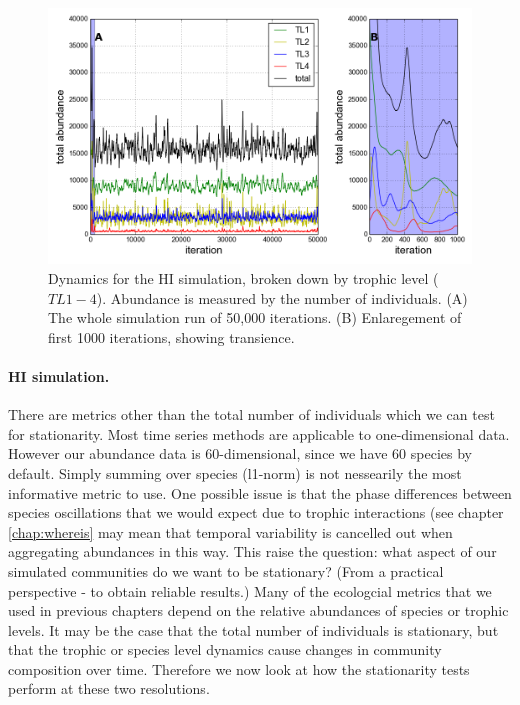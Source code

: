 \begin{figure}[h!]
	\centering
	\includegraphics[width=0.8\linewidth]{"./chapters/chapter04b/figures/hi_trophic_dynamics"}
     \caption{Dynamics for the HI simulation, broken down by trophic level ($TL1-4$). Abundance is measured by the number of individuals. (A) The whole simulation run of 50,000 iterations. (B) Enlaregement of first 1000 iterations, showing transience.} 
     \label{fig:hi_trophic_dynamics}   
\end{figure}


\paragraph*{HI simulation.}
There are metrics other than the total number of individuals which we can test for stationarity. Most time series methods are applicable to one-dimensional data. However our abundance data is 60-dimensional, since we have 60 species by default. Simply summing over species (l1-norm) is not nessearily the most informative metric to use. One possible issue is that the phase differences between species oscillations that we would expect due to trophic interactions (see chapter \ref{chap:whereis} may mean that temporal variability is cancelled out when aggregating abundances in this way. This raise the question: what aspect of our simulated communities do we want to be stationary? (From a practical perspective - to obtain reliable results.) Many of the ecologcial metrics that we used in previous chapters depend on the relative abundances of species or trophic levels. It may be the case that the total number of individuals is stationary, but that the trophic or species level dynamics cause changes in community composition over time. Therefore we now look at how the stationarity tests perform at these two resolutions.



